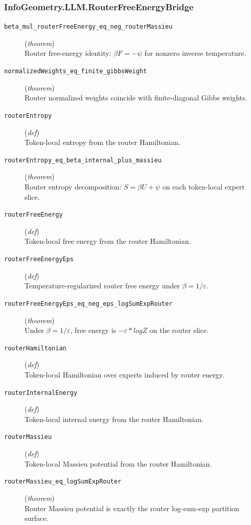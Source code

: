 \documentclass[11pt,a4paper]{article}
\begin{document}
\subsubsection*{InfoGeometry.LLM.RouterFreeEnergyBridge}
\begin{description}
  \item[\texttt{beta\_mul\_routerFreeEnergy\_eq\_neg\_routerMassieu}] (\textit{theorem}) \\ Router free-energy identity: $\beta  F = -\psi $ for nonzero inverse temperature.
  \item[\texttt{normalizedWeights\_eq\_finite\_gibbsWeight}] (\textit{theorem}) \\ Router normalized weights coincide with finite-diagonal Gibbs weights.
  \item[\texttt{routerEntropy}] (\textit{def}) \\ Token-local entropy from the router Hamiltonian.
  \item[\texttt{routerEntropy\_eq\_beta\_internal\_plus\_massieu}] (\textit{theorem}) \\ Router entropy decomposition: $S = \beta  U + \psi $ on each token-local expert slice.
  \item[\texttt{routerFreeEnergy}] (\textit{def}) \\ Token-local free energy from the router Hamiltonian.
  \item[\texttt{routerFreeEnergyEps}] (\textit{def}) \\ Temperature-regularized router free energy under $\beta  = 1/\varepsilon $.
  \item[\texttt{routerFreeEnergyEps\_eq\_neg\_eps\_logSumExpRouter}] (\textit{theorem}) \\ Under $\beta  = 1/\varepsilon $, free energy is $-\varepsilon  * log Z$ on the router slice.
  \item[\texttt{routerHamiltonian}] (\textit{def}) \\ Token-local Hamiltonian over experts induced by router energy.
  \item[\texttt{routerInternalEnergy}] (\textit{def}) \\ Token-local internal energy from the router Hamiltonian.
  \item[\texttt{routerMassieu}] (\textit{def}) \\ Token-local Massieu potential from the router Hamiltonian.
  \item[\texttt{routerMassieu\_eq\_logSumExpRouter}] (\textit{theorem}) \\ Router Massieu potential is exactly the router log-sum-exp partition surface.

\end{description}
\end{document}
